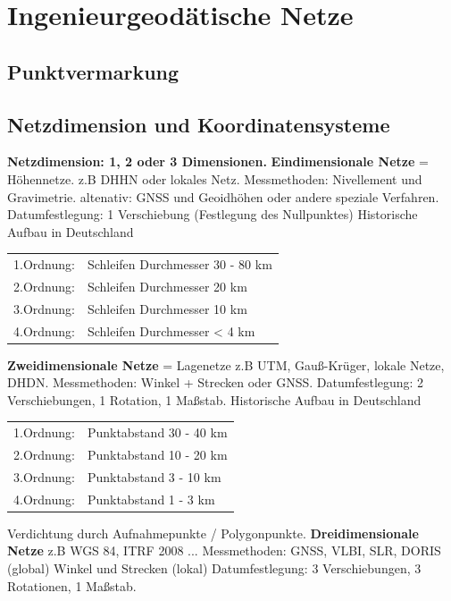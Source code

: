 \documentclass[12pt]{article}
\begin{document}
	\pagestyle{main}
\tableofcontents
\newpage
\section{Ingenieurgeodätische Netze}
\subsection{Punktvermarkung}
\subsection{Netzdimension und Koordinatensysteme}
\textbf{Netzdimension: 1, 2 oder 3 Dimensionen.}
\newline
\newline
\textbf{Eindimensionale Netze} = Höhennetze. z.B DHHN oder lokales Netz.
\newline
Messmethoden: Nivellement und Gravimetrie. altenativ: GNSS und Geoidhöhen oder andere speziale Verfahren.
\newline
Datumfestlegung: 1 Verschiebung (Festlegung des Nullpunktes)
\newline
Historische Aufbau in Deutschland
\begin{table}[ht]
\begin{tabular}{ll}
1.Ordnung: & Schleifen Durchmesser 30 - 80 km \\
2.Ordnung: & Schleifen Durchmesser 20 km \\
3.Ordnung: & Schleifen Durchmesser 10 km\\
4.Ordnung: & Schleifen Durchmesser < 4 km
\end{tabular}
\end{table}
\newline
\textbf{Zweidimensionale Netze} = Lagenetze z.B UTM, Gauß-Krüger, lokale Netze, DHDN.
\newline
Messmethoden: Winkel + Strecken oder GNSS.
\newline
Datumfestlegung: 2 Verschiebungen, 1 Rotation, 1 Maßstab. 
Historische Aufbau in Deutschland
\begin{table}[ht]
	\begin{tabular}{ll}
		1.Ordnung: & Punktabstand 30 - 40 km \\
		2.Ordnung: & Punktabstand 10 - 20 km \\
		3.Ordnung: & Punktabstand 3 - 10 km\\
		4.Ordnung: & Punktabstand 1 - 3 km
	\end{tabular}
\end{table}
Verdichtung durch Aufnahmepunkte / Polygonpunkte.
\newline
\newline
\textbf{Dreidimensionale Netze} z.B WGS 84, ITRF 2008 ...
\newline
Messmethoden: 
\newline
GNSS, VLBI, SLR, DORIS (global)
\newline
Winkel und Strecken (lokal)
\newline
Datumfestlegung: 3 Verschiebungen, 3 Rotationen, 1 Maßstab.
\end{document}
